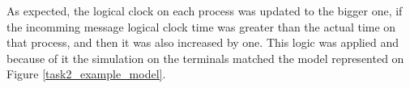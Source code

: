 \documentclass[a4paper, 11pt]{article}
\begin{document}
As expected, the logical clock on each process was updated to the bigger one, if the incomming message logical clock time was greater than the actual time on that process, and then it was also increased by one. This logic was applied and because of it the simulation on the terminals matched the model represented on Figure \ref{task2_example_model}.


% 
% 
\end{document}
